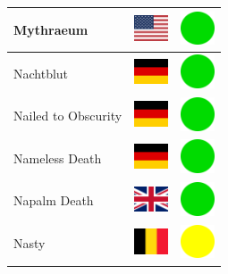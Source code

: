 \documentclass[12pt, a4paper, twoside]{report}
\begin{document}
\begin{center}
\begin{longtable}{|p{5cm}|p{2cm}|p{2cm}|}
Mythraeum & \includegraphics[width=1cm]{4x3/us} & \includegraphics[width=1cm]{likes/y} \\ \hline
Nachtblut & \includegraphics[width=1cm]{4x3/de} & \includegraphics[width=1cm]{likes/y} \\ \hline
Nailed to Obscurity & \includegraphics[width=1cm]{4x3/de} & \includegraphics[width=1cm]{likes/y} \\ \hline
Nameless Death & \includegraphics[width=1cm]{4x3/de} & \includegraphics[width=1cm]{likes/y} \\ \hline
Napalm Death & \includegraphics[width=1cm]{4x3/gb} & \includegraphics[width=1cm]{likes/y} \\ \hline
Nasty & \includegraphics[width=1cm]{4x3/be} & \includegraphics[width=1cm]{likes/m} \\ \hline

\end{longtable}
\end{center}
\end{document}
